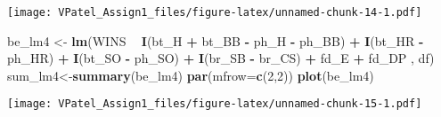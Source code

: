 \documentclass[]{article}
\newenvironment{Shaded}{\begin{snugshade}}{\end{snugshade}}
\newcommand{\DataTypeTok}[1]{\textcolor[rgb]{0.13,0.29,0.53}{#1}}
\newcommand{\DecValTok}[1]{\textcolor[rgb]{0.00,0.00,0.81}{#1}}
\newcommand{\KeywordTok}[1]{\textcolor[rgb]{0.13,0.29,0.53}{\textbf{#1}}}
\newcommand{\NormalTok}[1]{#1}
\newcommand{\OperatorTok}[1]{\textcolor[rgb]{0.81,0.36,0.00}{\textbf{#1}}}
\newcommand{\StringTok}[1]{\textcolor[rgb]{0.31,0.60,0.02}{#1}}
\begin{document}
\texttt{[image: VPatel\_Assign1\_files/figure-latex/unnamed-chunk-14-1.pdf]}

\begin{Shaded}
\begin{Highlighting}[]
\NormalTok{be_lm4 <-}\StringTok{ }\KeywordTok{lm}\NormalTok{(WINS }\OperatorTok{~}\StringTok{ }
\StringTok{              }\KeywordTok{I}\NormalTok{(bt_H }\OperatorTok{+}\StringTok{ }\NormalTok{bt_BB }
                \OperatorTok{-}\StringTok{ }\NormalTok{ph_H }\OperatorTok{-}\StringTok{ }\NormalTok{ph_BB) }\OperatorTok{+}\StringTok{ }
\StringTok{              }\KeywordTok{I}\NormalTok{(bt_HR }\OperatorTok{-}\StringTok{ }\NormalTok{ph_HR) }\OperatorTok{+}\StringTok{ }
\StringTok{              }\KeywordTok{I}\NormalTok{(bt_SO }\OperatorTok{-}\StringTok{ }\NormalTok{ph_SO) }\OperatorTok{+}\StringTok{ }
\StringTok{              }\KeywordTok{I}\NormalTok{(br_SB }\OperatorTok{-}\StringTok{ }\NormalTok{br_CS) }\OperatorTok{+}
\StringTok{              }\NormalTok{fd_E }\OperatorTok{+}\StringTok{ }\NormalTok{fd_DP , df)}
\NormalTok{sum_lm4<-}\KeywordTok{summary}\NormalTok{(be_lm4)}
\KeywordTok{par}\NormalTok{(}\DataTypeTok{mfrow=}\KeywordTok{c}\NormalTok{(}\DecValTok{2}\NormalTok{,}\DecValTok{2}\NormalTok{))}
\KeywordTok{plot}\NormalTok{(be_lm4)}
\end{Highlighting}
\end{Shaded}

\texttt{[image: VPatel\_Assign1\_files/figure-latex/unnamed-chunk-15-1.pdf]}
\end{document}
